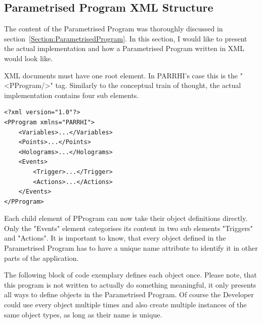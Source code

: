 \subsection{Parametrised Program XML Structure}
The content of the Parametrised Program was thoroughly discussed in section~\ref{Section:ParametrisedProgram}. In this section, I would like to present the actual implementation and how a Parametrised Program written in XML would look like.

XML documents must have one root element. In PARRHI's case this is the "<PProgram/>" tag. Similarly to the conceptual train of thought, the actual implementation contains four sub elements.

\begin{lstlisting}
<?xml version="1.0"?>
<PProgram xmlns="PARRHI">
	<Variables>...</Variables>
	<Points>...</Points>
	<Holograms>...</Holograms>
	<Events>
		<Trigger>...</Trigger>
		<Actions>...</Actions>
	</Events>
</PProgram>
\end{lstlisting}

Each child element of PProgram can now take their object definitions directly. Only the "Events" element categorises its content in two sub elements "Triggers" and "Actions". It is important to know, that every object defined in the Parametrised Program has to have a unique name attribute to identify it in other parts of the application. 

The following block of code exemplary defines each object once. Please note, that this program is not written to actually do something meaningful, it only presents all ways to define objects in the Parametrised Program. Of course the Developer could use every object multiple times and also create multiple instances of the same object types, as long as their name is unique.

